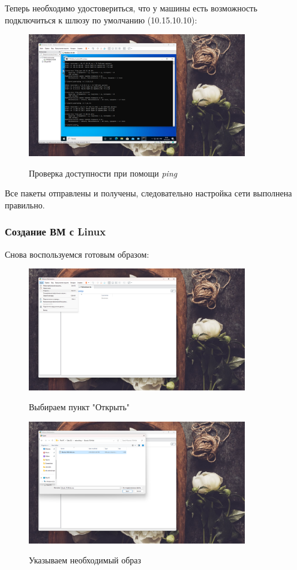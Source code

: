 \documentclass[a4paper]{article}
\begin{document}
  Теперь необходимо удостовериться, что у машины есть возможность подключиться
  к шлюзу по умолчанию (10.15.10.10):

  \begin{figure}[H]
    \centering
    \includegraphics[width=0.85\textwidth]{06_00 (26)}
    \label{img:26}
    \caption{Проверка доступности при помощи \textit{ping}}
  \end{figure}

  Все пакеты отправлены и получены, следовательно настройка сети выполнена правильно.

  \subsubsection{Создание ВМ с Linux}

  Снова воспользуемся готовым образом:
  
  \begin{figure}[H]
    \centering
    \includegraphics[width=0.85\textwidth]{06_00 (27)}
    \label{img:27}
    \caption{Выбираем пункт "Открыть"}
  \end{figure}
  
  \begin{figure}[H]
    \centering
    \includegraphics[width=0.85\textwidth]{06_00 (28)}
    \label{img:28}
    \caption{Указываем необходимый образ}
  \end{figure}
  
\end{document}
